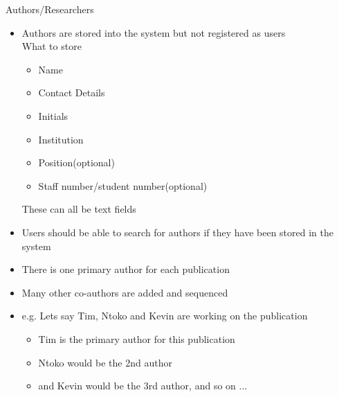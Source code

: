 \documentclass{article}
\begin{document}
	Authors/Researchers
	\begin{itemize}
		\item Authors are stored into the system but not registered as users\\
			What to store
			\begin{itemize}
				\item Name
				\item Contact Details
				\item Initials
				\item Institution
				\item Position(optional)
				\item Staff number/student number(optional)
			\end{itemize}
			These can all be text fields
		\item Users should be able to search for authors if they have been stored in the system
		\item There is one primary author for each publication
		\item Many other co-authors are added and sequenced
		\item e.g. Lets say Tim, Ntoko and Kevin are working on the publication
		\begin{itemize}
			\item Tim is the primary author for this publication
			\item Ntoko would be the 2nd author
			\item and Kevin would be the 3rd author, and so on ...
		\end{itemize}
	\end{itemize}
\end{document}
